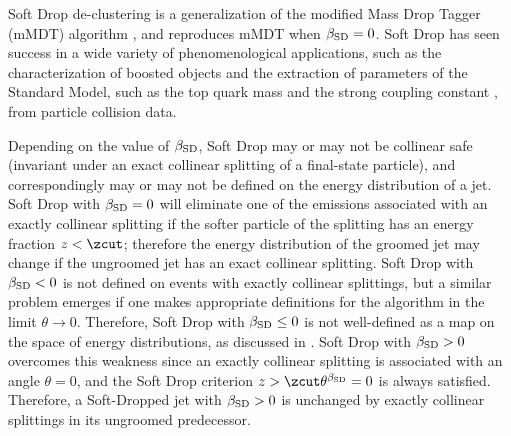 Soft Drop de-clustering is a generalization of the modified Mass Drop Tagger (mMDT) algorithm \cite{Dasgupta:2013ihk}, and reproduces mMDT when \(\beta_{\rm SD} = 0\).
%
Soft Drop has seen success in a wide variety of phenomenological applications, such as the characterization of boosted objects \cite{Thaler:2008ju,Thaler:2011gf,Hook:2011cq,Gallicchio:2011xq,Soper:2012pb,Gallicchio:2012ez,CMS-PAS-JME-09-001,CMS-PAS-EXO-09-002,CMS:2013kfa,ATL-PHYS-PUB-2009-081,ATL-PHYS-PUB-2010-008,ATLAS:2019kwg,Cui:2010km,ATLAS-CONF-2011-053,Chatrchyan:2013rla,Larkoski:2013eya,Dasgupta:2012hg,Backovic:2013bga,ATLAS-CONF-2013-084,Komiske:2018vkc,Komiske:2016rsd,Metodiev:2018ftz,Krohn:2012fg,MERINO:2013tta,Bhattacherjee:2016bpy,Macaluso:2018tck,Egan:2017ojy,Kasieczka:2017nvn,Pearkes:2017hku,Butter:2017cot,Catani:1992ua,Dokshitzer:1998kz,Dasgupta:2001sh,Banfi:2004yd,Banfi:2005gj,Ellis:2009su,Banfi:2010pa,Walsh:2011fz,Chien:2012ur,Li:2012bw,Jouttenus:2013hs,Hatta:2013iba,Larkoski:2014tva,Procura:2018zpn,Aaboud:2017aca,Frye:2016aiz, Almeida:2008yp,Larkoski:2017iuy,Larkoski:2017cqq,Thaler:2010tr,Ellis:2009me,Abdesselam:2010pt,Katz:2010mr,Gallicchio:2010dq,Adams:2015hiv,Sirunyan:2017ezt,Moore:2018lsr,FerreiradeLima:2016gcz,Rubin:2010fc,Chatrchyan:2012sn,CMS-PAS-BTV-13-001,CMS-PAS-JME-13-006,Kribs:2009yh,Chen:2010wk,Hackstein:2010wk,Kim:2010uj,Almeida:2011aa,Pandolfi:2012ima,Vernieri:2014wfa,CMS-PAS-HIG-17-007,Procura:2014cba} and the extraction of parameters of the Standard Model, such as the top quark mass \cite{Hoang:2017kmk,ATLAS:2021urs,Negrini:2022gec} and the strong coupling constant \cite{Marzani:2019evv}, from particle collision data.

Depending on the value of \(\beta_{\rm SD}\), Soft Drop may or may not be collinear safe (invariant under an exact collinear splitting of a final-state particle), and correspondingly may or may not be defined on the energy distribution of a jet.
%
Soft Drop with \(\beta_{\rm SD} = 0\) will eliminate one of the emissions associated with an exactly collinear splitting if the softer particle of the splitting has an energy fraction \(z < \zcut\);
%
therefore the energy distribution of the groomed jet may change if the ungroomed jet has an exact collinear splitting.
%
Soft Drop with \(\beta_{\rm SD} < 0\) is not defined on events with exactly collinear splittings, but a similar problem emerges if one makes appropriate definitions for the algorithm in the limit \(\theta \to 0\).
%
Therefore, Soft Drop with \(\beta_{\rm SD} \leq 0\) is not well-defined as a map on the space of energy distributions, as discussed in .
%
Soft Drop with \(\beta_{\rm SD} > 0\) overcomes this weakness since an exactly collinear splitting is associated with an angle \(\theta = 0\), and the Soft Drop criterion \(z > \zcut \theta^{\beta_{\rm SD}} = 0\) is always satisfied.
%
Therefore, a Soft-Dropped jet with \(\beta_{\rm SD} > 0\) is unchanged by exactly collinear splittings in its ungroomed predecessor.


